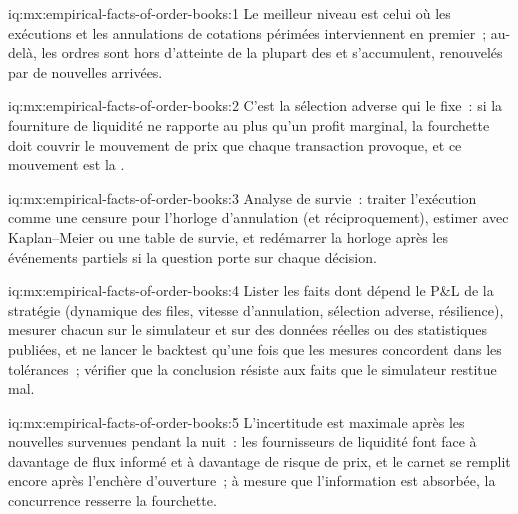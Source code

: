 \begin{solution}{iq:mx:empirical-facts-of-order-books:1}
Le meilleur niveau est celui où les exécutions et les annulations de cotations périmées interviennent en premier~; au-delà, les ordres sont hors d'atteinte de la plupart des  et s'accumulent,
renouvelés par de nouvelles arrivées. 
\end{solution}

\begin{solution}{iq:mx:empirical-facts-of-order-books:2}
C'est la sélection adverse qui le fixe~: si la fourniture de liquidité ne rapporte au plus qu'un profit marginal, la fourchette doit couvrir le mouvement de prix que chaque transaction provoque, et ce
mouvement est la . 
\end{solution}

\begin{solution}{iq:mx:empirical-facts-of-order-books:3}
Analyse de survie~: traiter l'exécution comme une censure pour l'horloge d'annulation (et réciproquement), estimer avec Kaplan--Meier ou une table de survie, et redémarrer la
horloge après les événements partiels si la question porte sur chaque décision. 
\end{solution}

\begin{solution}{iq:mx:empirical-facts-of-order-books:4}
Lister les faits dont dépend le P\&L de la stratégie (dynamique des files, vitesse d'annulation, sélection adverse, résilience), mesurer chacun sur le simulateur et sur
des données réelles ou des statistiques publiées, et ne lancer le backtest qu'une fois que les mesures concordent dans les tolérances~; vérifier que la conclusion résiste aux faits que le simulateur
restitue mal. 
\end{solution}

\begin{solution}{iq:mx:empirical-facts-of-order-books:5}
L'incertitude est maximale après les nouvelles survenues pendant la nuit~: les fournisseurs de liquidité font face à davantage de flux informé et à davantage de risque de prix, et le carnet se remplit encore après
l'enchère d'ouverture~; à mesure que l'information est absorbée, la concurrence resserre la fourchette. 
\end{solution}

